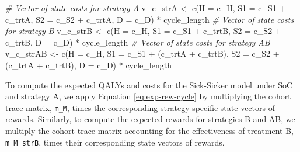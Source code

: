 \documentclass[
]{article}
\newenvironment{Shaded}{\begin{snugshade}}{\end{snugshade}}
\newcommand{\AttributeTok}[1]{\textcolor[rgb]{0.77,0.63,0.00}{#1}}
\newcommand{\CommentTok}[1]{\textcolor[rgb]{0.56,0.35,0.01}{\textit{#1}}}
\newcommand{\FunctionTok}[1]{\textcolor[rgb]{0.00,0.00,0.00}{#1}}
\newcommand{\NormalTok}[1]{#1}
\newcommand{\OtherTok}[1]{\textcolor[rgb]{0.56,0.35,0.01}{#1}}
\newcommand{\SpecialCharTok}[1]{\textcolor[rgb]{0.00,0.00,0.00}{#1}}
\begin{document}
\begin{Shaded}
\begin{Highlighting}[]
\CommentTok{\# Vector of state costs for strategy A}
\NormalTok{v\_c\_strA }\OtherTok{\textless{}{-}} \FunctionTok{c}\NormalTok{(}\AttributeTok{H  =}\NormalTok{ c\_H, }
              \AttributeTok{S1 =}\NormalTok{ c\_S1 }\SpecialCharTok{+}\NormalTok{ c\_trtA, }
              \AttributeTok{S2 =}\NormalTok{ c\_S2 }\SpecialCharTok{+}\NormalTok{ c\_trtA, }
              \AttributeTok{D  =}\NormalTok{ c\_D) }\SpecialCharTok{*}\NormalTok{ cycle\_length }
\CommentTok{\# Vector of state costs for strategy B}
\NormalTok{v\_c\_strB }\OtherTok{\textless{}{-}} \FunctionTok{c}\NormalTok{(}\AttributeTok{H  =}\NormalTok{ c\_H, }
              \AttributeTok{S1 =}\NormalTok{ c\_S1 }\SpecialCharTok{+}\NormalTok{ c\_trtB, }
              \AttributeTok{S2 =}\NormalTok{ c\_S2 }\SpecialCharTok{+}\NormalTok{ c\_trtB, }
              \AttributeTok{D  =}\NormalTok{ c\_D) }\SpecialCharTok{*}\NormalTok{ cycle\_length }
\CommentTok{\# Vector of state costs for strategy AB}
\NormalTok{v\_c\_strAB }\OtherTok{\textless{}{-}} \FunctionTok{c}\NormalTok{(}\AttributeTok{H  =}\NormalTok{ c\_H, }
               \AttributeTok{S1 =}\NormalTok{ c\_S1 }\SpecialCharTok{+}\NormalTok{ (c\_trtA }\SpecialCharTok{+}\NormalTok{ c\_trtB), }
               \AttributeTok{S2 =}\NormalTok{ c\_S2 }\SpecialCharTok{+}\NormalTok{ (c\_trtA }\SpecialCharTok{+}\NormalTok{ c\_trtB), }
               \AttributeTok{D  =}\NormalTok{ c\_D) }\SpecialCharTok{*}\NormalTok{ cycle\_length }
\end{Highlighting}
\end{Shaded}

To compute the expected QALYs and costs for the Sick-Sicker model under SoC and strategy A, we apply Equation \eqref{eq:exp-rew-cycle} by multiplying the cohort trace matrix, \texttt{m\_M}, times the corresponding strategy-specific state vectors of rewards. Similarly, to compute the expected rewards for strategies B and AB, we multiply the cohort trace matrix accounting for the effectiveness of treatment B, \texttt{m\_M\_strB}, times their corresponding state vectors of rewards.
\end{document}
